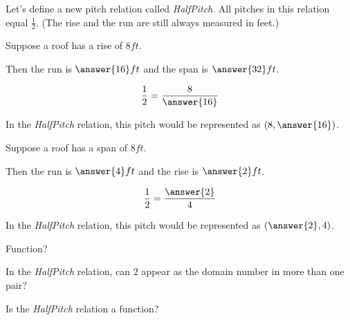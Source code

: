 \documentclass{ximera}
\begin{document}
Let's define a new pitch relation called \textit{HalfPitch}.  All pitches in this relation equal $\frac{1}{2}$.  (The rise and the run are still always measured in feet.)




\begin{question}

Suppose a roof has a rise of $8 ft$.  

Then the run is $\answer{16} ft$ and the span is $\answer{32} ft$.

\[
\frac{1}{2} = \frac{8}{\answer{16}}
\]


In the \textit{HalfPitch} relation, this pitch would be represented as $\left( 8, \answer{16} \right)$.

\end{question}








\begin{question}

Suppose a roof has a span of $8 ft$.  

Then the run is $\answer{4} ft$ and the rise is $\answer{2} ft$.

\[
\frac{1}{2} = \frac{\answer{2}}{4}
\]


In the \textit{HalfPitch} relation, this pitch would be represented as $\left( \answer{2}, 4 \right)$.

\end{question}







\begin{exercise}  Function?

In the \textit{HalfPitch} relation, can $2$ appear as the domain number in more than one pair?
\begin{multipleChoice}
\end{multipleChoice}





Is the \textit{HalfPitch} relation a function?
\begin{multipleChoice}
\end{multipleChoice}

\end{exercise}
\end{document}
